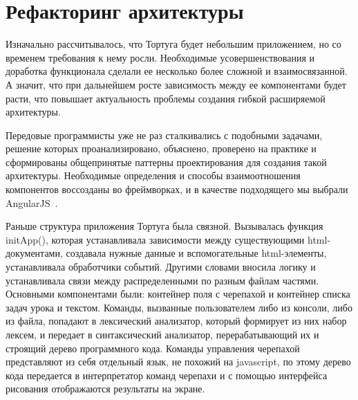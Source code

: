 \section{Рефакторинг архитектуры} \label{sect1_1}
Изначально рассчитывалось, что Тортуга будет небольшим приложением, но со временем требования к нему росли. Необходимые усовершенствования и доработка функционала сделали ее несколько более сложной и взаимосвязанной. А значит, что при дальнейшем росте зависимость между ее компонентами будет расти, что повышает актуальность проблемы создания гибкой расширяемой архитектуры. 

Передовые программисты уже не раз сталкивались с подобными задачами, решение которых проанализировано, объяснено, проверено на практике и сформированы общепринятые паттерны проектирования для создания такой архитектуры. Необходимые определения и способы взаимоотношения компонентов воссозданы во фреймворках, и в качестве подходящего мы выбрали AngularJS~\cite{angular1, angular2, angular3, angular4, angular5}.

Раньше структура приложения Тортуга была связной. Вызывалась функция initApp(), которая устанавливала зависимости между существующими html-документами, создавала нужные данные и вспомогательные html-элементы, устанавливала обработчики событий. Другими словами вносила логику и устанавливала связи между распределенными по разным файлам частями. Основными компонентами были: контейнер поля с черепахой и контейнер списка задач урока и текстом. Команды, вызванные пользователем либо из консоли, либо из файла, попадают в лексический анализатор, который формирует из них набор лексем, и передает в синтаксический анализатор, перерабатывающий их и строящий дерево программного кода. Команды управления черепахой представляют из себя отдельный язык, не похожий на javascript, по этому дерево кода передается в интерпретатор команд черепахи и с помощью интерфейса рисования отображаются результаты на экране.

